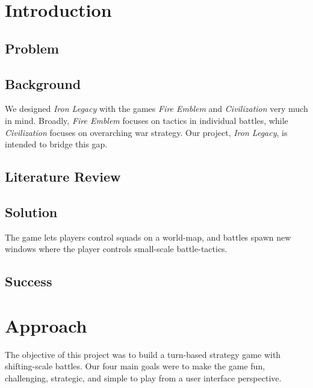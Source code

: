 \documentclass{article}
\begin{document}
\clearpage

\section*{Introduction}

\subsection*{Problem}

\subsection*{Background}
We designed \emph{Iron Legacy} with the games 
\emph{Fire Emblem}\cite{FireEmblem} and \emph{Civilization}\cite{Civilization} 
very much in mind.
Broadly, \emph{Fire Emblem} focuses on tactics in individual battles, while
\emph{Civilization} focuses on overarching war strategy.
Our project, \emph{Iron Legacy}, is intended to bridge this gap.

\subsection*{Literature Review}

\subsection*{Solution}
The game lets players control squads on a world-map, and battles spawn new 
windows where the player controls small-scale battle-tactics.

\subsection*{Success}

\section*{Approach}
The objective of this project was to build a turn-based strategy game with 
shifting-scale battles.
Our four main goals were to make the game fun, challenging, strategic, and 
simple to play from a user interface perspective.
\end{document}
